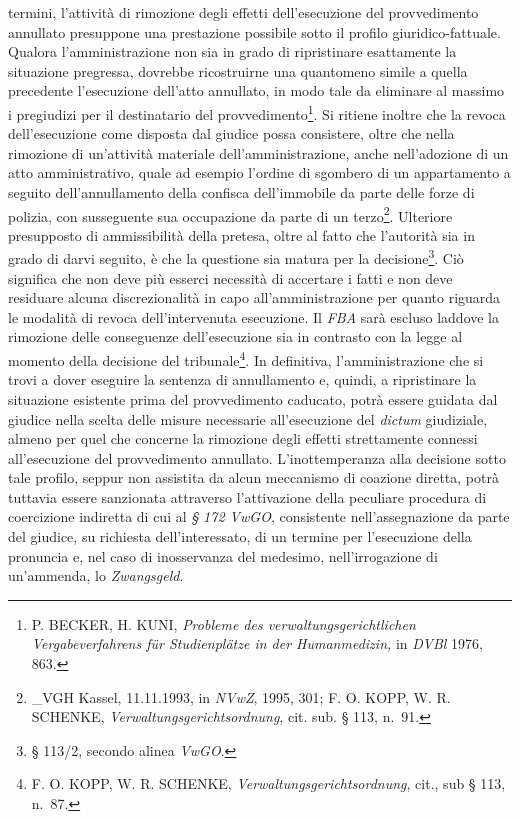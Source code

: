 \documentclass[12pt,it,a4paper,]{report}
\begin{document}
termini, l'attività di rimozione degli effetti dell'esecuzione del
provvedimento annullato presuppone una prestazione possibile sotto il
profilo giuridico-fattuale. Qualora l'amministrazione non sia in grado
di ripristinare esattamente la situazione pregressa, dovrebbe
ricostruirne una quantomeno simile a quella precedente l'esecuzione
dell'atto annullato, in modo tale da eliminare al massimo i pregiudizi
per il destinatario del provvedimento\footnote{P. BECKER, H. KUNI,
  \emph{Probleme des verwaltungsgerichtlichen Vergabeverfahrens für
  Studienplätze in der Humanmedizin,} in \emph{DVBl} 1976, 863.}. Si
ritiene inoltre che la revoca dell'esecuzione come disposta dal giudice
possa consistere, oltre che nella rimozione di un'attività materiale
dell'amministrazione, anche nell'adozione di un atto amministrativo,
quale ad esempio l'ordine di sgombero di un appartamento a seguito
dell'annullamento della confisca dell'immobile da parte delle forze di
polizia, con susseguente sua occupazione da parte di un
terzo\footnote{\_VGH Kassel, 11.11.1993, in \emph{NVwZ}, 1995, 301; F.
  O. KOPP, W. R. SCHENKE, \emph{Verwaltungsgerichtsordnung}, cit. sub. §
  113, n.~91.}. Ulteriore presupposto di ammissibilità della pretesa,
oltre al fatto che l'autorità sia in grado di darvi seguito, è che la
questione sia matura per la decisione\footnote{§ 113/2, secondo alinea
  \emph{VwGO}.}. Ciò significa che non deve più esserci necessità di
accertare i fatti e non deve residuare alcuna discrezionalità in capo
all'amministrazione per quanto riguarda le modalità di revoca
dell'intervenuta esecuzione. Il \emph{FBA} sarà escluso laddove la
rimozione delle conseguenze dell'esecuzione sia in contrasto con la
legge al momento della decisione del tribunale\footnote{F. O. KOPP, W.
  R. SCHENKE, \emph{Verwaltungsgerichtsordnung}, cit., sub § 113, n.~87.}.
In definitiva, l'amministrazione che si trovi a dover eseguire la
sentenza di annullamento e, quindi, a ripristinare la situazione
esistente prima del provvedimento caducato, potrà essere guidata dal
giudice nella scelta delle misure necessarie all'esecuzione del
\emph{dictum} giudiziale, almeno per quel che concerne la rimozione
degli effetti strettamente connessi all'esecuzione del provvedimento
annullato. L'inottemperanza alla decisione sotto tale profilo, seppur
non assistita da alcun meccanismo di coazione diretta, potrà tuttavia
essere sanzionata attraverso l'attivazione della peculiare procedura di
coercizione indiretta di cui al \emph{§ 172 VwGO}, consistente
nell'assegnazione da parte del giudice, su richiesta dell'interessato,
di un termine per l'esecuzione della pronuncia e, nel caso di
inosservanza del medesimo, nell'irrogazione di un'ammenda, lo
\emph{Zwangsgeld}.
\end{document}
